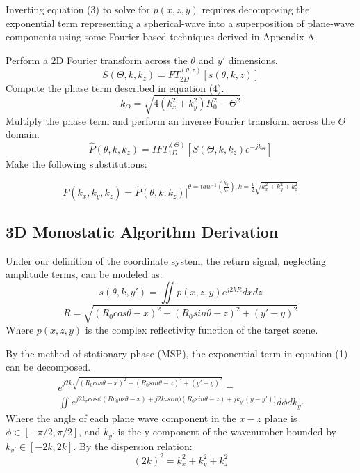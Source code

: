 \documentclass[conference]{IEEEtran}
\begin{document}
Inverting equation (3) to solve for $p(x,z,y)$ requires decomposing the exponential term representing a spherical-wave into a superposition of plane-wave components using some Fourier-based techniques derived in Appendix A.

Perform a 2D Fourier transform across the $\theta$ and $y'$ dimensions.
\begin{equation}
	S(\Theta,k,k_z) = FT^{(\theta,z)}_{2D}[s(\theta,k,z)]
\end{equation} 
Compute the phase term described in equation (4).
\begin{equation}
	k_\Theta = \sqrt{4(k_x^2+k_y^2)R_0^2 - \Theta^2}
\end{equation}
Multiply the phase term and perform an inverse Fourier transform across the $\Theta$ domain.
\begin{equation}
	\hat{P}(\theta,k,k_z) = IFT^{(\Theta)}_{1D} [S(\Theta,k,k_z)e^{-jk_\Theta}]
\end{equation}
Make the following substitutions:

\begin{equation}
	P(k_x,k_y,k_z) = \hat{P}(\theta,k,k_z) \biggr\rvert^{\theta = tan^{-1}(\frac{k_y}{k_x}),k = \frac{1}{2} \sqrt{k_x^2+k_y^2+k_z^2}}
\end{equation}

\appendix

\subsection{3D Monostatic Algorithm Derivation}
Under our definition of the coordinate system, the return signal, neglecting amplitude terms, can be modeled as:
\begin{equation}
s(\theta,k,y') = \iint p(x,z,y) e^{j2kR} dxdz
\end{equation}
\begin{equation}
R = \sqrt{(R_0cos\theta - x)^2 +  (R_0sin\theta - z)^2 + (y' - y)^2}
\end{equation}
Where $p(x,z,y)$ is the complex reflectivity function of the target scene.

By the method of stationary phase (MSP), the exponential term in equation (1) can be decomposed.
\begin{multline}
e^{j2k\sqrt{(R_0cos\theta - x)^2 + (R_0sin\theta - z)^2 + (y' - y)^2}} = \\ 
\iint e^{j2k_rcos\phi(Rc_0os\theta - x) + j2k_rsin\phi(R_0sin\theta - z) + jk_{y'}(y-y'))} d\phi dk_{y'}
\end{multline}
Where the angle of each plane wave component in the $x-z$ plane is $\phi \in [-\pi/2,\pi/2]$, and $k_{y'}$ is the y-component of the wavenumber bounded by $k_{y'} \in [-2k,2k]$.
By the dispersion relation:
\begin{equation}
	(2k)^2 = k_x^2 + k_y^2 + k_z^2
\end{equation}
\end{document}
